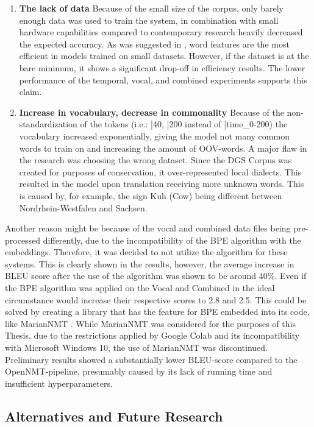 \begin{enumerate}
    \item \textbf{The lack of data} Because of the small size of the corpus, only barely enough data was used to train the system, in combination with small hardware capabilities compared to contemporary research heavily decreased the expected accuracy. As was suggested in \citet{qi2018and}, word features are the most efficient in models trained on small datasets. However, if the dataset is at the bare minimum, it shows a significant drop-off in efficiency results. The lower performance of the temporal, vocal, and combined experiments supports this claim.  
    \item \textbf{Increase in vocabulary, decrease in commonality} Because of the non-standardization of the tokens (i.e.: |40, |200 instead of |time\_0-200) the vocabulary increased exponentially, giving the model not many common words to train on and increasing the amount of OOV-words. A major flaw in the research was choosing the wrong dataset. Since the DGS Corpus \cite{dgscorpus_3} was created for purposes of conservation, it over-represented local dialects. This resulted in the model upon translation receiving more unknown words. This is caused by, for example, the sign Kuh (Cow) being different between Nordrhein-Westfalen and Sachsen.
\end{enumerate}

Another reason might be because of the vocal and combined data files being pre-processed differently, due to the incompatibility of the BPE algorithm with the embeddings. Therefore, it was decided to not utilize the algorithm for these systems. This is clearly shown in the results, however, the average increase in BLEU score after the use of the algorithm was shown to be around 40\%. Even if the BPE algorithm was applied on the Vocal and Combined in the ideal circumstance would increase their respective scores to 2.8 and 2.5. This could be solved by creating a library that has the feature for BPE embedded into its code, like MarianNMT \cite{mariannmt}. While MarianNMT was considered for the purposes of this Thesis, due to the restrictions applied by Google Colab and its incompatibility with Microsoft Windows 10, the use of MarianNMT was discontinued. Preliminary results showed a substantially lower BLEU-score compared to the OpenNMT-pipeline, presumably caused by its lack of running time and insufficient hyperparameters.

\subsection{Alternatives and Future Research}

